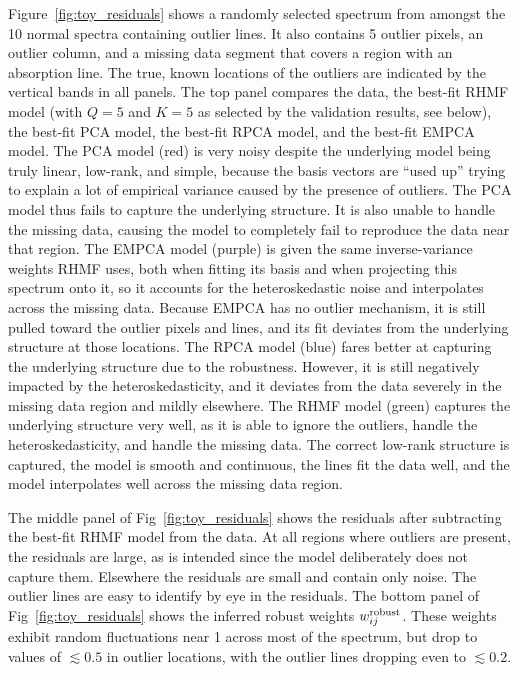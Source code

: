 \documentclass[onecolumn,floatfix,linenumbers,trackchanges]{aastex631}
\begin{document}
Figure~\ref{fig:toy_residuals} shows a randomly selected spectrum from amongst the 10 normal spectra containing outlier lines.
It also contains 5 outlier pixels, an outlier column, and a missing data segment that covers a region with an absorption line.
The true, known locations of the outliers are indicated by the vertical bands in all panels.
The top panel compares the data, the best-fit RHMF model (with $Q=5$ and $K=5$ as selected by the validation results, see below), the best-fit PCA model, the best-fit RPCA model, and the best-fit EMPCA model.
The PCA model (red) is very noisy despite the underlying model being truly linear, low-rank, and simple, because the basis vectors are ``used up'' trying to explain a lot of empirical variance caused by the presence of outliers.
The PCA model thus fails to capture the underlying structure.
It is also unable to handle the missing data, causing the model to completely fail to reproduce the data near that region.
The EMPCA model (purple) is given the same inverse-variance weights RHMF uses, both when fitting its basis and when projecting this spectrum onto it, so it accounts for the heteroskedastic noise and interpolates across the missing data. Because EMPCA has no outlier mechanism, it is still pulled toward the outlier pixels and lines, and its fit deviates from the underlying structure at those locations.
The RPCA model (blue) fares better at capturing the underlying structure due to the robustness.
However, it is still negatively impacted by the heteroskedasticity, and it deviates from the data severely in the missing data region and mildly elsewhere.
The RHMF model (green) captures the underlying structure very well, as it is able to ignore the outliers, handle the heteroskedasticity, and handle the missing data.
The correct low-rank structure is captured, the model is smooth and continuous, the lines fit the data well, and the model interpolates well across the missing data region.

The middle panel of Fig~\ref{fig:toy_residuals} shows the residuals after subtracting the best-fit RHMF model from the data.
At all regions where outliers are present, the residuals are large, as is intended since the model deliberately does not capture them.
Elsewhere the residuals are small and contain only noise.
The outlier lines are easy to identify by eye in the residuals.
The bottom panel of Fig~\ref{fig:toy_residuals} shows the inferred robust weights $w_{ij}^{\rm robust}$.
These weights exhibit random fluctuations near 1 across most of the spectrum, but drop to values of $\lesssim 0.5$ in outlier locations, with the outlier lines dropping even to $\lesssim 0.2$.
\end{document}
